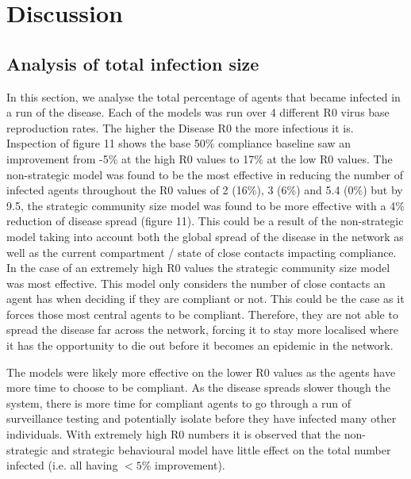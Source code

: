 \documentclass{article}
\begin{document}
\section{Discussion}

\subsection{Analysis of total infection size}

In this section, we analyse the total percentage of agents that became infected in a run of the disease. Each of the models was run over 4 different R0 virus base reproduction rates. The higher the Disease R0 the more infectious it is. Inspection of figure 11 shows the base 50\% compliance baseline saw an improvement from -5\% at the high R0 values to 17\% at the low R0 values. The non-strategic model was found to be the most effective in reducing the number of infected agents throughout the R0 values of 2 (16\%), 3 (6\%) and 5.4 (0\%) but by 9.5, the strategic community size model was found to be more effective with a 4\% reduction of disease spread (figure 11). This could be a result of the non-strategic model taking into account both the global spread of the disease in the network as well as the current compartment / state of close contacts impacting compliance. In the case of an extremely high R0 values the strategic community size model was most effective.  This model only considers the number of close contacts an agent has when deciding if they are compliant or not. This could be the case as it forces those most central agents to be compliant. Therefore, they are not able to spread the disease far across the network, forcing it to stay more localised where it has the opportunity to die out before it becomes an epidemic in the network.\newline 

The models were likely more effective on the lower R0 values as the agents have more time to choose to be compliant. As the disease spreads slower though the system, there is more time for compliant agents to go through a run of surveillance testing and potentially isolate before they have infected many other individuals. With extremely high R0 numbers it is observed that the non-strategic and strategic behavioural model have little effect on the total number infected (i.e. all having $< 5$\% improvement). \newline 
\end{document}
